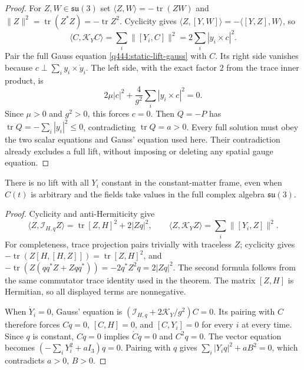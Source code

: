 \begin{proof}
For $Z,W\in\mathfrak{su}(3)$ set
$\langle Z,W\rangle=-\operatorname{tr}(ZW)$ and
$\|Z\|^2=\operatorname{tr}(Z^*Z)=-\operatorname{tr}Z^2$.
Cyclicity gives
$\langle Z,[Y,W]\rangle=-\langle[Y,Z],W\rangle$, so
\[
 \langle C,\mathscr K_YC\rangle
 =\sum_i\|[Y_i,C]\|^2
 =2\sum_i|y_i\times c|^2.
\]
Pair the full Gauss equation \eqref{q444:static-lift-gauss} with $C$.
Its right side vanishes because $c\perp\sum_i y_i\times\dot y_i$.
The left side, with the exact factor $2$ from the trace inner product, is
\[
 2\mu|c|^2+\frac4{g^2}\sum_i|y_i\times c|^2=0.
\]
Since $\mu>0$ and $g^2>0$, this forces $c=0$.
Then $Q=-P$ has
$\operatorname{tr}Q=-\sum_i|y_i|^2\leq0$, contradicting
$\operatorname{tr}Q=a>0$.
Every full solution must obey the two scalar equations and Gauss'
equation used here. Their contradiction already excludes a full lift,
without imposing or deleting any spatial gauge equation.
\end{proof}

\begin{corollary}
\label{q444:static-complex-no-lift}
There is no lift with all $Y_i$ constant in the constant-matter frame,
even when $C(t)$ is arbitrary and the fields take values in the full
complex algebra $\mathfrak{su}(3)$.
\end{corollary}
\begin{proof}
Cyclicity and anti-Hermiticity give
\[
 \langle Z,\mathscr I_{H,q}Z\rangle
 =\operatorname{tr}[Z,H]^2+2|Zq|^2,\qquad
 \langle Z,\mathscr K_YZ\rangle=\sum_i\|[Y_i,Z]\|^2.
\]
For completeness, trace projection pairs trivially with traceless $Z$;
cyclicity gives
$-\operatorname{tr}(Z[H,[H,Z]])=\operatorname{tr}[Z,H]^2$, and
$-\operatorname{tr}(Z(qq^*Z+Zqq^*))=-2q^*Z^2q=2|Zq|^2$.
The second formula follows from the same commutator trace identity used
in the theorem. The matrix $[Z,H]$ is Hermitian, so all displayed
terms are nonnegative.

When $\dot Y_i=0$, Gauss' equation is
$(\mathscr I_{H,q}+2\mathscr K_Y/g^2)C=0$.
Its pairing with $C$ therefore forces $Cq=0$, $[C,H]=0$, and
$[C,Y_i]=0$ for every $i$ at every time.
Since $q$ is constant, $Cq=0$ implies $\dot Cq=0$ and $C^2q=0$.
The vector equation becomes
$(-\sum_iY_i^2+aI_3)q=0$. Pairing with $q$ gives
$\sum_i|Y_iq|^2+aB^2=0$, which contradicts $a>0$, $B>0$.
\end{proof}


